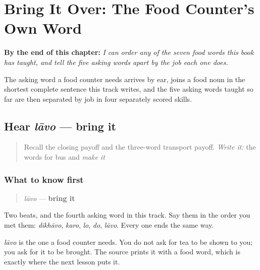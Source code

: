 
\chapter{Bring It Over: The Food Counter's Own Word}
\label{ch:mw-bring-request}

\begin{chapteropening}
\textbf{By the end of this chapter:} \emph{I can order any of the seven food words this book has taught, and tell the five asking words apart by the job each one does.}

The asking word a food counter needs arrives by ear, joins a food noun in the shortest complete sentence this track writes, and the five asking words taught so far are then separated by job in four separately scored skills.
\end{chapteropening}

\section[lāvo]{Hear \emph{lāvo} — bring it}

\label{lesson:MW-C25-hear-lavo}



\begin{quote}
Recall the closing payoff and the three-word transport payoff. \emph{Write it:} the words for bus and \emph{make it}
\end{quote}

\subsection*{What to know first}
\begin{quote}
\emph{lāvo} — \textbf{bring it}
\end{quote}

Two beats, and the fourth asking word in this track. Say them in the order you met them: \emph{dikhāvo}, \emph{karo}, \emph{lo}, \emph{do}, \emph{lāvo}. Every one ends the same way.

\emph{lāvo} is the one a food counter needs. You do not ask for tea to be shown to you; you ask for it to be brought. The source prints it with a food word, which is exactly where the next lesson puts it.

